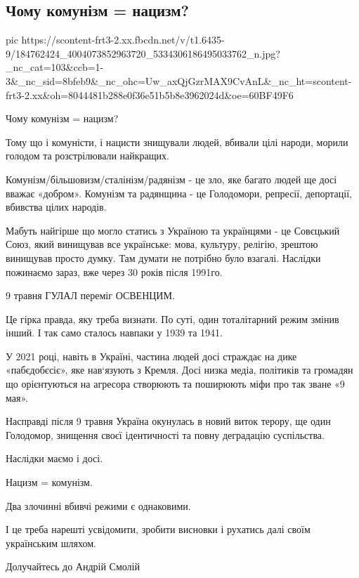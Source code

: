  
 
 
 
 
\subsection{Чому комунізм = нацизм?}
\label{sec:09_05_2021.fb.smolij_andrij.1.kommunizm_nacizm}


\ifcmt
  pic https://scontent-frt3-2.xx.fbcdn.net/v/t1.6435-9/184762424_4004073852963720_5334306186495033762_n.jpg?_nc_cat=103&ccb=1-3&_nc_sid=8bfeb9&_nc_ohc=Uw_axQjGzrMAX9CvAnL&_nc_ht=scontent-frt3-2.xx&oh=8044481b288e0f36e51b5b8e3962024d&oe=60BF49F6
\fi


Чому комунізм = нацизм? 

Тому що і комуністи, і нацисти знищували людей, вбивали цілі народи, морили
голодом та розстрілювали найкращих.

Комунізм/більшовизм/сталінізм/радянізм - це зло, яке багато людей ще досі
вважає «добром». Комунізм та радянщина - це Голодомори, репресії, депортації,
вбивства цілих народів.

Мабуть найгірше що могло статись з Україною та українцями - це Совєцький Союз,
який винищував все українське: мова, культуру, релігію, зрештою винищував
просто думку. Там думати не потрібно було взагалі. Наслідки пожинаємо зараз,
вже через 30 років після 1991го. 

9 травня ГУЛАЛ переміг ОСВЕНЦИМ. 

Це гірка правда, яку треба визнати. По суті, один тоталітарний режим змінив
інший. І так само сталось навпаки у 1939 та 1941. 

У 2021 році, навіть в Україні, частина людей досі страждає на дике
«пабєдобєсіє», яке нав‘язують з Кремля. Досі низка медіа, політиків та громадян
що орієнтуються на агресора створюють та поширюють міфи про так зване «9 мая».

Насправді після 9 травня Україна окунулась в новий виток терору, ще один
Голодомор, знищення своєї ідентичності та повну деградацію суспільства.

Наслідки маємо і досі.

Нацизм = комунізм. 

Два злочинні вбивчі режими є однаковими. 

І це треба нарешті усвідомити, зробити висновки і рухатись далі своїм українським шляхом.

Долучайтесь до Андрій Смолій
